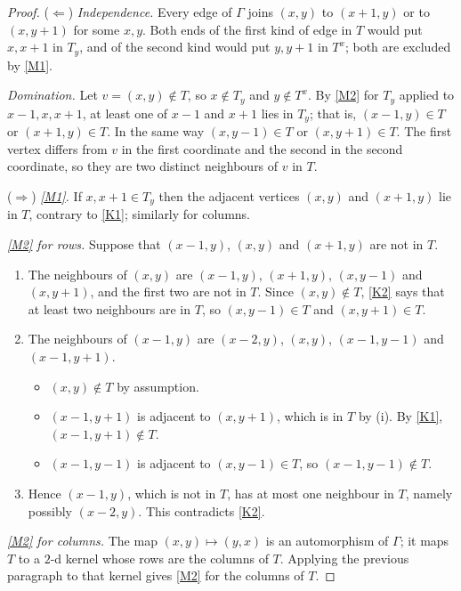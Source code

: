\documentclass[11pt]{article}
\theoremstyle{plain}
\theoremstyle{definition}
\theoremstyle{remark}
\begin{document}
\begin{proof}
($\Leftarrow$) \emph{Independence.} Every edge of $\Gamma$ joins $(x,y)$ to $(x+1,y)$ or to
$(x, y+1)$ for some $x, y$. Both ends of the first kind of edge in $T$ would put $x, x+1$ in
$T_y$, and of the second kind would put $y, y+1$ in $T^x$; both are excluded by \ref{M1}.

\emph{Domination.} Let $v = (x,y) \notin T$, so $x \notin T_y$ and $y \notin T^x$. By
\ref{M2} for $T_y$ applied to $x-1, x, x+1$, at least one of $x - 1$ and $x + 1$ lies in
$T_y$; that is, $(x-1, y) \in T$ or $(x+1, y) \in T$. In the same way $(x, y-1) \in T$ or
$(x, y+1) \in T$. The first vertex differs from $v$ in the first coordinate and the second in
the second coordinate, so they are two distinct neighbours of $v$ in $T$.

($\Rightarrow$) \emph{\ref{M1}.} If $x, x+1 \in T_y$ then the adjacent vertices $(x,y)$ and
$(x+1,y)$ lie in $T$, contrary to \ref{K1}; similarly for columns.

\emph{\ref{M2} for rows.} Suppose that $(x-1,y)$, $(x,y)$ and $(x+1,y)$ are not in $T$.
\begin{enumerate}[label=(\roman*)]
  \item The neighbours of $(x,y)$ are $(x-1,y)$, $(x+1,y)$, $(x,y-1)$ and $(x,y+1)$, and the
        first two are not in $T$. Since $(x,y) \notin T$, \ref{K2} says that at least two
        neighbours are in $T$, so $(x, y-1) \in T$ and $(x, y+1) \in T$.
  \item The neighbours of $(x-1,y)$ are $(x-2,y)$, $(x,y)$, $(x-1,y-1)$ and $(x-1,y+1)$.
        \begin{itemize}
          \item $(x,y) \notin T$ by assumption.
          \item $(x-1, y+1)$ is adjacent to $(x, y+1)$, which is in $T$ by (i). By
                \ref{K1}, $(x-1, y+1) \notin T$.
          \item $(x-1, y-1)$ is adjacent to $(x, y-1) \in T$, so $(x-1, y-1) \notin T$.
        \end{itemize}
  \item Hence $(x-1, y)$, which is not in $T$, has at most one neighbour in $T$, namely
        possibly $(x-2,y)$. This contradicts \ref{K2}.
\end{enumerate}
\emph{\ref{M2} for columns.} The map $(x,y) \mapsto (y,x)$ is an automorphism of $\Gamma$; it
maps $T$ to a $2$-d kernel whose rows are the columns of $T$. Applying the previous paragraph
to that kernel gives \ref{M2} for the columns of $T$.
\end{proof}
\end{document}
